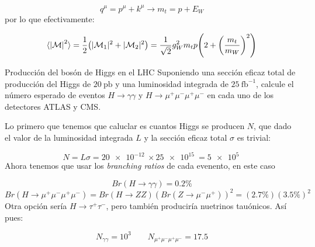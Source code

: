 \begin{equation}
	q^\mu = p^\mu + k^\mu \longrightarrow  m_t = p+E_W
\end{equation}
por lo que efectivamente: 

\begin{equation}
	\langle \vqty{\Mcal}^2 \rangle = \frac{1}{2} \pqty{|\Mcal_1|^2 + |\Mcal_2|^2} = \frac{1}{\sqrt{2}}g_W^2 m_t p \pqty{2+\pqty{\frac{m_t}{m_W}}^2}
\end{equation}


\begin{Ejercicio}{Producción del bosón de Higgs en el LHC}\label{Ej:23}
Suponiendo una sección eficaz total de producción del Higgs de $20~\text{pb}$ y una luminosidad integrada de $25~\text{fb}^{-1}$,
calcule el número esperado de eventos $H \to \gamma\gamma$ y $H \to \mu^+\mu^-\mu^+\mu^-$ en cada uno de los detectores ATLAS y CMS.
\end{Ejercicio}

Lo primero que tenemos que caluclar es cuantos Higgs se producen $N$, que dado el valor de la luminosidad integrada $L$ y la sección eficaz total $\sigma$ es trivial: 

\begin{equation}
	N = L \sigma = \SI{20e-12}{} \times \SI{25e15}{}= \SI{5e5}{} 
\end{equation}
Ahora tenemos que usar los \textit{branching ratios} de cada evenento, en este caso

\begin{equation}
	Br(H\to\gamma\gamma) = 0.2\%  
\end{equation} 
\begin{equation}
	Br(H\to\mu^+\mu^-\mu^+\mu^-) = Br(H\to ZZ)(Br(Z\to\mu^-\mu^+))^2 = (2.7\%)(3.5\%)^2 
\end{equation}
Otra opción sería $H\to \tau^+\tau^-$, pero también produciría nuetrinos tauónicos. Así pues: 

\begin{equation}
	N_{\gamma \gamma} = 10^3 \qquad N_{\mu^+\mu^-\mu^+\mu^-} = 17.5 
\end{equation}


